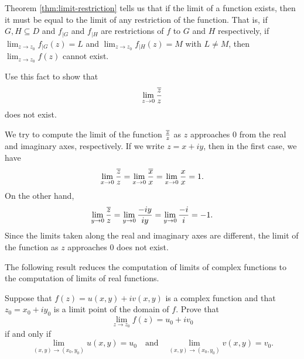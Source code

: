 \begin{example}
    \label{ex:limit-zbar-over-z}
    Theorem \ref{thm:limit-restriction} tells us that if the limit of a function exists, then it must be equal to the limit of any restriction of the function. That is, if \(G,H \subseteq D\) and \(f_{|G}\) and \(f_{|H}\) are restrictions of \(f\) to \(G\) and \(H\) respectively, if \(\lim_{z \to z_0} f_{|G}(z) = L\) and \(\lim_{z \to z_0} f_{|H}(z) = M\) with \(L \neq M\), then \(\lim_{z \to z_0} f(z)\) cannot exist.

    Use this fact to show that \[\lim_{z \to 0} \frac{\overline{z}}{z}\] does not exist.

    \begin{solution}
        We try to compute the limit of the function \(\frac{\overline{z}}{z}\) as \(z\) approaches \(0\) from the real and imaginary axes, respectively. If we write \(z = x + iy\), then in the first case, we have
        \[
            \lim_{x \to 0} \frac{\overline{z}}{z} = \lim_{x \to 0} \frac{\overline{x}}{x} = \lim_{x \to 0} \frac{x}{x} = 1.
        \]
        On the other hand,
        \[
            \lim_{y \to 0} \frac{\overline{z}}{z} = \lim_{y \to 0} \frac{-iy}{iy} = \lim_{y \to 0} \frac{-i}{i} = -1.
        \]
        Since the limits taken along the real and imaginary axes are different, the limit of the function as \(z\) approaches \(0\) does not exist.
    \end{solution}
\end{example}


The following result reduces the computation of limits of complex functions to the computation of limits of real functions. 

\begin{theorem}%
    Suppose that \(f(z) = u(x, y) + iv(x, y)\) is a complex function and that \(z_0 = x_0 + iy_0\) is a limit point of the domain of \(f\). Prove that
    \begin{equation}
        \lim_{z \to z_0} f(z) = u_0 + iv_0
        \label{eq:complex-limit-real-eq-1}
    \end{equation}
    if and only if
    \begin{equation}
        \lim_{(x, y) \to (x_0, y_0)} u(x, y) = u_0 \quad \text{and} \quad \lim_{(x, y) \to (x_0, y_0)} v(x, y) = v_0.
        \label{eq:complex-limit-real-eq-2}
    \end{equation}
    \label{thm:complex-limit-real}
\end{theorem}

